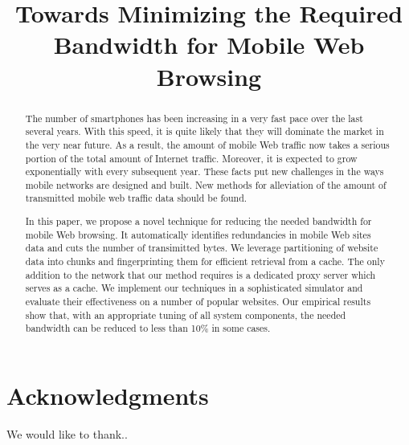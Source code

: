 \documentclass[10pt, conference, compsocconf]{IEEEtran}
\begin{document}
%
\title{Towards Minimizing the Required Bandwidth for Mobile Web Browsing}


\author{
}

\maketitle

\begin{abstract}
The number of smartphones has been increasing in a very fast pace over the last several 
years. With this speed, it is quite likely that they will dominate the market in the very 
near future. As a result, the amount of mobile Web traffic now takes a serious portion of 
the total amount of Internet traffic. Moreover, it is expected to grow exponentially with 
every subsequent year. These facts put new challenges in the ways mobile networks are designed 
and built. New methods for alleviation of the amount of transmitted mobile web traffic data
should be found. 

In this paper, we propose a novel technique for reducing the needed bandwidth for mobile Web 
browsing. It automatically identifies redundancies in mobile Web sites data and cuts the number
of transimitted bytes. We leverage partitioning of website data into chunks and fingerprinting them
for efficient retrieval from a cache. The only addition to the network that our method requires 
is a dedicated proxy server which serves as a cache. We implement our techniques in a sophisticated 
simulator and evaluate their effectiveness on a number of popular websites. Our empirical results 
show that, with an appropriate tuning of all system components, the needed bandwidth can be reduced 
to less than 10\% in some cases.

\end{abstract}


%
\IEEEpeerreviewmaketitle











\section*{Acknowledgments}
We would like to thank.. 



\end{document}
